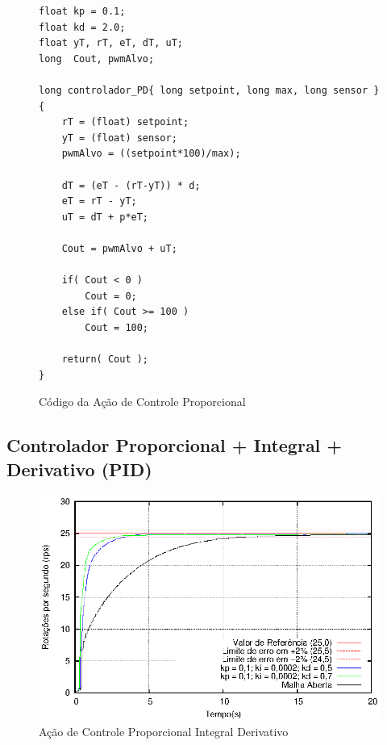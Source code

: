 \begin{figure}[!htb]
\centering
\begin{minipage}{0.8\linewidth}
\begin{lstlisting}
float kp = 0.1;
float kd = 2.0;
float yT, rT, eT, dT, uT;
long  Cout, pwmAlvo;

long controlador_PD{ long setpoint, long max, long sensor }
{
    rT = (float) setpoint;
    yT = (float) sensor;
    pwmAlvo = ((setpoint*100)/max);

    dT = (eT - (rT-yT)) * d;
    eT = rT - yT;
    uT = dT + p*eT;

    Cout = pwmAlvo + uT;

    if( Cout < 0 )
        Cout = 0;
    else if( Cout >= 100 )
        Cout = 100;

    return( Cout );
}
\end{lstlisting}
\end{minipage}
\caption{Código da Ação de Controle Proporcional}
\label{fig:codigoControladorP}
\end{figure}





\subsection{ Controlador Proporcional + Integral + Derivativo (PID) }

\begin{figure}[!htb]
\center\includegraphics[scale=1]{./imagens/acaoPID.eps}
\caption{Ação de Controle Proporcional Integral Derivativo}
\label{fig:acaoPID}
\end{figure}



